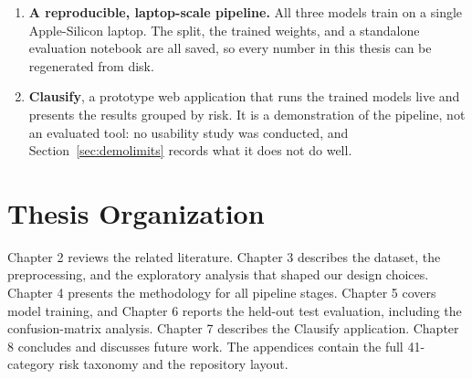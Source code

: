 \begin{enumerate}[itemsep=2pt]
  \item \textbf{A reproducible, laptop-scale pipeline.} All three models train on a single Apple-Silicon laptop. The split, the trained weights, and a standalone evaluation notebook are all saved, so every number in this thesis can be regenerated from disk.
  \item \textbf{Clausify}, a prototype web application that runs the trained models live and presents the results grouped by risk. It is a demonstration of the pipeline, not an evaluated tool: no usability study was conducted, and Section~\ref{sec:demolimits} records what it does not do well.
\end{enumerate}

\section{Thesis Organization}
Chapter 2 reviews the related literature. Chapter 3 describes the dataset, the preprocessing, and the exploratory analysis that shaped our design choices. Chapter 4 presents the methodology for all pipeline stages. Chapter 5 covers model training, and Chapter 6 reports the held-out test evaluation, including the confusion-matrix analysis. Chapter 7 describes the Clausify application. Chapter 8 concludes and discusses future work. The appendices contain the full 41-category risk taxonomy and the repository layout.
